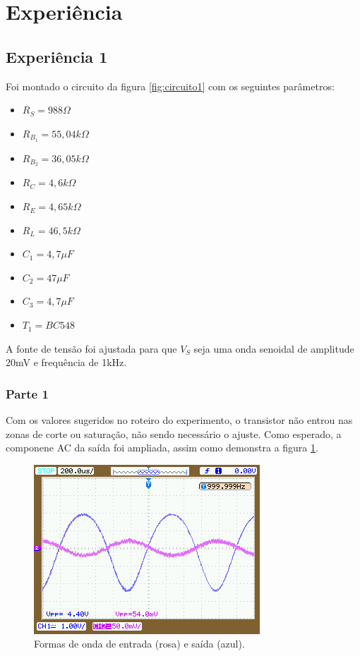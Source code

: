 \documentclass{abntex2}
\begin{document}
\section{Experiência}
\subsection{Experiência 1}

Foi montado o circuito da figura \ref{fig:circuito1} com os seguintes parâmetros:
\begin{itemize}
  \item $R_S = 988\Omega $
  \item $R_B_1 = 55,04k\Omega $
  \item $R_B_2 = 36,05k\Omega $
  \item $R_C = 4,6k\Omega$
  \item $R_E = 4,65k\Omega$
  \item $R_L = 46,5k\Omega$
  \item $C_1 = 4,7\mu F$
  \item $C_2 = 47\mu F$
  \item $C_3 = 4,7 \mu F$
  \item $T_1 = BC548$
\end{itemize}

A fonte de tensão foi ajustada para que $V_S$ seja uma onda senoidal de amplitude 20mV e frequência de 1kHz.
\subsubsection{Parte 1}

  Com os valores sugeridos no roteiro do experimento, o transistor não entrou nas zonas de corte ou saturação,
  não sendo necessário o ajuste. Como esperado, a componene AC da saída foi ampliada, assim como demonstra a figura \ref{fig:saida1}.

  \begin{figure}[h]
    \centering
    \includegraphics[scale = 0.5]{saida1.png}
    \caption{Formas de onda de entrada (rosa) e saída (azul).}
    \label{fig:saida1}
  \end{figure}
\end{document}

